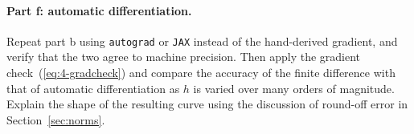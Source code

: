 \paragraph{Part f: automatic differentiation.}
Repeat part b using \texttt{autograd} or \texttt{JAX} instead of the
hand-derived gradient, and verify that the two agree to machine precision.
Then apply the gradient check~(\ref{eq:4-gradcheck}) and compare the accuracy
of the finite difference with that of automatic differentiation as $h$ is
varied over many orders of magnitude.  Explain the shape of the resulting
curve using the discussion of round-off error in
Section~\ref{sec:norms}.
